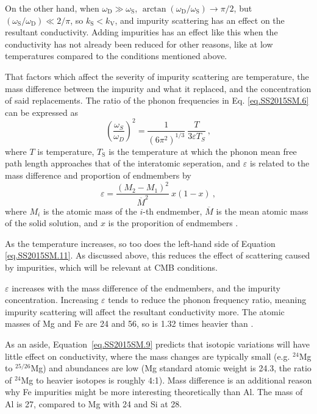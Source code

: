 On the other hand, when $\omega_{\mathrm{D}}\gg\omega_{\mathrm{S}}$, $\arctan(\omega_{\mathrm{D}}/\omega_{\mathrm{S}})\rightarrow\pi/2$, but $(\omega_{\mathrm{S}}/\omega_{\mathrm{D}})\ll 2/\pi$, so $k_{\mathrm{S}} < k_{\mathrm{V}}$, and impurity scattering has an effect on the resultant conductivity. Adding impurities has an effect like this when the conductivity has not already been reduced for other reasons, like at low temperatures compared to the conditions mentioned above. 

That factors which affect the severity of impurity scattering are temperature, the mass difference between the impurity and what it replaced, and the concentration of said replacements. The ratio of the phonon frequencies in Eq. \ref{eq.SS2015SM.6} can be expressed \citep[][Eq. S11]{Stackhouse2015} as
%
\begin{equation}
\left ( \frac{\omega_{S}}{\omega_{D}} \right )^{2} = \frac{1}{\left ( 6\pi^{2} \right )^{1/3}} \ \frac{T}{3 \varepsilon T_{S}} \ ,
\label{eq.SS2015SM.11}
\end{equation}
%
where $T$ is temperature, $T_{\mathrm{S}}$ is the temperature at which the phonon mean free path length approaches that of the interatomic seperation, and $\varepsilon$ is related to the mass difference and proportion of endmembers by
%
\begin{equation}
\varepsilon = \frac{\left (M_{2}-M_{1}  \right )^{2}}{\overline{M}^{2}} \ x\left ( 1-x \right ) \ ,
\label{eq.SS2015SM.9}
\end{equation}
%
where $M_{i}$ is the atomic mass of the $i$-th endmember, $\overline{M}$ is the mean atomic mass of the solid solution, and $x$ is the proporition of endmembers \citep[][Eq. S9]{Stackhouse2015}.

As the temperature increases, so too does the left-hand side of Equation \ref{eq.SS2015SM.11}. As discussed above, this reduces the effect of scattering caused by impurities, which will be relevant at CMB conditions. 

$\varepsilon$ increases with the mass difference of the endmembers, and the impurity concentration. Increasing $\varepsilon$ tends to reduce the phonon frequency ratio, meaning impurity scattering will affect the resultant conductivity more. The atomic masses of Mg and Fe are 24 and 56, so \fesios is 1.32 times heavier than \mgsio. 

As an aside, Equation~\ref{eq.SS2015SM.9} predicts that isotopic variations will have little effect on conductivity, where the mass changes are typically small (e.g. $^{24}$Mg to $^{25/26}$Mg) and abundances are low (Mg standard atomic weight is 24.3, the ratio of $^{24}$Mg to heavier isotopes is roughly 4:1). Mass difference is an additional reason why Fe impurities might be more interesting theoretically than Al. The mass of Al is 27, compared to Mg with 24 and Si at 28.

